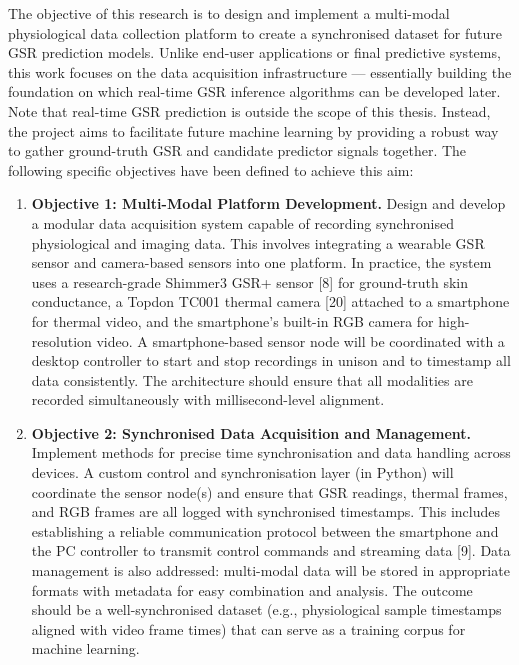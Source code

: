 The objective of this research is to design and implement a multi-modal physiological data collection platform to create a synchronised dataset for future GSR prediction models. Unlike end-user applications or final predictive systems, this work focuses on the data acquisition infrastructure --- essentially building the foundation on which real-time GSR inference algorithms can be developed later. Note that real-time GSR prediction is outside the scope of this thesis. Instead, the project aims to facilitate future machine learning by providing a robust way to gather ground-truth GSR and candidate predictor signals together. The following specific objectives have been defined to achieve this aim:

\begin{enumerate}
  \item \textbf{Objective 1: Multi-Modal Platform Development.} Design and develop a modular data acquisition system capable of recording synchronised physiological and imaging data. This involves integrating a wearable GSR sensor and camera-based sensors into one platform. In practice, the system uses a research-grade Shimmer3 GSR+ sensor [8] for ground-truth skin conductance, a Topdon TC001 thermal camera [20] attached to a smartphone for thermal video, and the smartphone's built-in RGB camera for high-resolution video. A smartphone-based sensor node will be coordinated with a desktop controller to start and stop recordings in unison and to timestamp all data consistently. The architecture should ensure that all modalities are recorded simultaneously with millisecond-level alignment.
  \item \textbf{Objective 2: Synchronised Data Acquisition and Management.} Implement methods for precise time synchronisation and data handling across devices. A custom control and synchronisation layer (in Python) will coordinate the sensor node(s) and ensure that GSR readings, thermal frames, and RGB frames are all logged with synchronised timestamps. This includes establishing a reliable communication protocol between the smartphone and the PC controller to transmit control commands and streaming data [9]. Data management is also addressed: multi-modal data will be stored in appropriate formats with metadata for easy combination and analysis. The outcome should be a well-synchronised dataset (e.g., physiological sample timestamps aligned with video frame times) that can serve as a training corpus for machine learning.

\end{enumerate}

